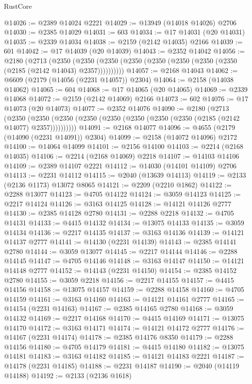 \begin{lexlean}{RustCore}
\begin{coremodule}
@14026 := @2389 @14024 @2221
@14029 := @13949 (@14018 @14026) @2706
@14030 := @2385 @14029
@14031 := 603
@14034 := @17 @14031 (@20 @14031)
@14035 := @2339 @14034
@14038 := @2159 (@2142 @14035) @2166
@14039 := 601
@14042 := @17 @14039 (@20 @14039)
@14043 := @2352 @14042
@14056 := @2180
    (@2713
      (@2350 (@2350 (@2350 (@2350 (@2350 (@2350 (@2350 (@2350 (@2185 (@2142 @14043) @2357))))))))))
@14057 := @2168 @14043
@14062 := @6609 (@2179 (@14056 (@2231 @14057)) @2304)
@14064 := @2158 (@14038 @14062)
@14065 := 604
@14068 := @17 @14065 (@20 @14065)
@14069 := @2339 @14068
@14072 := @2159 (@2142 @14069) @2166
@14073 := 602
@14076 := @17 @14073 (@20 @14073)
@14077 := @2352 @14076
@14090 := @2180
    (@2713
      (@2350 (@2350 (@2350 (@2350 (@2350 (@2350 (@2350 (@2350 (@2185 (@2142 @14077) @2357))))))))))
@14091 := @2168 @14077
@14096 := @4655 (@2179 (@14090 (@2231 @14091)) @2304)
@14099 := @2158 (@14072 @14096) @2172
@14100 := @14064 @14099
@14101 := @2156 @14100
@14103 := @2214 (@2168 @14035)
@14106 := @2214 (@2168 @14069) @2218
@14107 := @14103 @14106
@14109 := @2389 @14107 @2221
@14112 := @14030 (@14101 @14109) @2706
@14113 := @2231 @14112
@14115 := @2040 (@13639 @14113)
@14119 := @2133 (@2136 @1173) @13072 @8065
@14121 := @2209 (@2210 @1862)
@14122 := @2288 @13077
@14123 := @4705 @14122
@14124 := @3059 @14123
@14125 := @2217 @14124
@14126 := @3163 @14125
@14128 := @14121 @14126 @2777
@14130 := @2385 @14128 @2780
@14131 := @2288 @2218
@14132 := @4705 @14131
@14133 := @4415 @14132
@14134 := @13075 @14133
@14135 := @3059 @14134
@14136 := @2217 @14135
@14137 := @3163 @14136
@14139 := @14121 @14137 @2777
@14141 := @14130 (@2231 @14139)
@14143 := @2385 @14141 @2780
@14144 := @3059 @13077
@14145 := @2217 @14144
@14146 := @2288 @14145
@14147 := @4705 @14146
@14148 := @3163 @14147
@14150 := @14121 @14148 @2777
@14152 := @14143 (@2231 @14150)
@14154 := @2385 @14152 @2780
@14155 := @3059 @2218
@14156 := @2217 @14155
@14157 := @4415 @14156
@14158 := @13075 @14157
@14159 := @2288 @14158
@14160 := @4705 @14159
@14161 := @3163 @14160
@14163 := @14121 @14161 @2777
@14165 := @14154 (@2231 @14163)
@14167 := @2385 @14165 @2780
@14168 := @3059 @14132
@14169 := @2217 @14168
@14170 := @4415 @14169
@14171 := @13075 @14170
@14172 := @3163 @14171
@14174 := @14121 @14172 @2777
@14176 := @14167 (@2231 @14174)
@14178 := @2385 @14176 @8350
@14179 := @2288 @14156
@14180 := @4705 @14179
@14181 := @4415 @14180
@14182 := @13075 @14181
@14183 := @3163 @14182
@14185 := @14121 @14183 @2221
@14187 := @14178 (@2231 @14185)
@14188 := @2231 @14187
@14190 := @2040 (@14119 @14188)
@14192 := @2133 (@2136 @1618)

\end{coremodule}
\end{lexlean}
